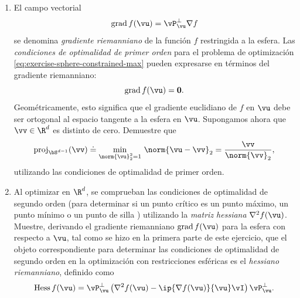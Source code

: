 \documentclass[../../book-main.tex]{subfiles}
\begin{document}
\begin{exercise}
\begin{enumerate}
\begin{equation*}
            \end{equation*}
            y que la proyección ortogonal sobre este subespacio es
            $\vP_{\vu}^\perp = \vI - \vu\vu^\top$.
        \item El campo vectorial 
            \begin{equation}\label{eq:exercise-riemann-grad-sphere}
                \mathrm{grad}\, f(\vu) = \vP_{\vu}^\perp \nabla f
            \end{equation}
            se denomina \textit{gradiente riemanniano} de la
            función $f$ restringida a la esfera.
            Las \textit{condiciones de optimalidad de primer orden} para el
            problema de optimización
            \eqref{eq:exercise-sphere-constrained-max} pueden
            expresarse en términos del gradiente riemanniano:
            \begin{equation*}
                \mathrm{grad}\, f(\vu) = \mathbf{0}.
            \end{equation*}
            Geométricamente, esto significa que el gradiente euclidiano de
            $f$ en $\vu$ debe ser ortogonal al espacio tangente a
            la esfera en $\vu$.
            Supongamos ahora que $\vv \in \R^d$ es distinto de cero. Demuestre que
            \begin{equation*}
                \mathrm{proj}_{\bS^{d-1}}(\vv) \doteq
                \min_{\norm{\vu}_2^2 = 1}\, \norm{\vu - \vv}_2
                =
                \frac{\vv}{\norm{\vv}_2},
            \end{equation*}
            utilizando las condiciones de optimalidad de primer orden.
        \item Al optimizar en $\R^d$, se comprueban las
            condiciones de optimalidad de segundo orden (para determinar si
                un punto crítico es un punto máximo, un punto mínimo o un punto de silla
            ) utilizando la \textit{matriz hessiana} $\nabla^2 f(\vu)$.
            Muestre, derivando el gradiente riemanniano
            $\mathrm{grad}\, f(\vu)$ para la esfera con respecto a
            $\vu$, tal como se hizo en la primera parte de este ejercicio, que el
            objeto correspondiente para determinar las condiciones de
            optimalidad de segundo orden en la optimización con restricciones esféricas
            es el \textit{hessiano riemanniano}, definido como
            \begin{equation}\label{eq:exercise-riemann-hess-sphere}
                \mathrm{Hess}\, f(\vu) = \vP_{\vu}^\perp \left(
                    \nabla^2 f(\vu) - \ip{\nabla f(\vu)}{\vu} \vI
                \right) \vP_{\vu}^\perp.
            \end{equation}
    \end{enumerate}
\end{exercise}
\end{document}
